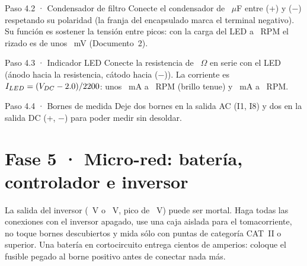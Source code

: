 \documentclass[11pt]{article}
\begin{document}
\begin{paso}{Paso 4.2 · Condensador de filtro}
Conecte el condensador de \ValCapacitanciaMicro\ $\mu$F entre (+) y (−) respetando su polaridad (la franja del
encapsulado marca el terminal negativo). Su función es sostener la tensión entre picos: con la carga del LED a
\ValRpmReferencia\ RPM el rizado es de unos \ValRizadoRef\ mV (Documento~2).
\end{paso}

\begin{paso}{Paso 4.3 · Indicador LED}
Conecte la resistencia de \ValResistenciaLed\ $\Omega$ en serie con el LED (ánodo hacia la resistencia, cátodo
hacia (−)). La corriente es $I_{LED}=(V_{DC}-2.0)/2200$: unos \ValCorrienteLedRefMili\ mA a
\ValRpmReferencia\ RPM (brillo tenue) y \ValCorrienteLedMaxMili\ mA a \ValRpmMaxima\ RPM.
\end{paso}

\begin{paso}{Paso 4.4 · Bornes de medida}
Deje dos bornes en la salida AC (I1, I8) y dos en la salida DC (+, −) para poder medir sin desoldar.
\end{paso}

\section{Fase 5 · Micro-red: batería, controlador e inversor}
\begin{advertencia}
La salida del inversor (\ValInversorTension\ V o \ValInversorTensionAlta\ V, pico de \ValInversorPicoAlto\ V) puede
ser mortal. Haga todas las conexiones con el inversor apagado, use una caja aislada para el tomacorriente, no
toque bornes descubiertos y mida sólo con puntas de categoría CAT~II o superior. Una batería en cortocircuito
entrega cientos de amperios: coloque el fusible pegado al borne positivo antes de conectar nada más.
\end{advertencia}
\end{document}
